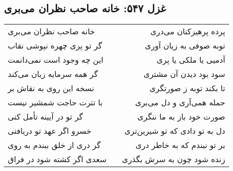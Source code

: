 \begin{center}
\section*{غزل ۵۴۷: خانه صاحب نظران می‌بری}
\label{sec:547}
\begin{longtable}{l p{0.5cm} r}
خانه صاحب نظران می‌بری
&&
پرده پرهیزکنان می‌دری
\\
گر تو پری چهره نپوشی نقاب
&&
توبه صوفی به زیان آوری
\\
این چه وجود است نمی‌دانمت
&&
آدمیی یا ملکی یا پری
\\
گر همه سرمایه زیان می‌کند
&&
سود بود دیدن آن مشتری
\\
نسخه این روی به نقاش بر
&&
تا بکند توبه ز صورتگری
\\
با تترت حاجت شمشیر نیست
&&
حمله همی‌آری و دل می‌بری
\\
گر تو در آیینه تأمل کنی
&&
صورت خود باز به ما ننگری
\\
خسرو اگر عهد تو دریافتی
&&
دل به تو دادی که تو شیرین‌تری
\\
گر دری از خلق ببندم به روی
&&
بر تو نبندم که به خاطر دری
\\
سعدی اگر کشته شود در فراق
&&
زنده شود چون به سرش بگذری
\\
\end{longtable}
\end{center}
